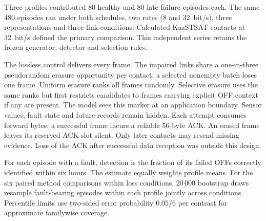 Three profiles contributed 80 healthy and 80 late-failure episodes each. The same 480 episodes ran under both schedules, two rates (8 and 32~bit/s), three representations and three link conditions. Calculated KazSTSAT contacts at 32~bit/s defined the primary comparison. This independent series retains the frozen generator, detector and selection rules.

The lossless control delivers every frame. The impaired links share a one-in-three pseudorandom erasure opportunity per contact; a selected nonempty batch loses one frame. Uniform erasure ranks all frames randomly. Selective erasure uses the same ranks but first restricts candidates to frames carrying explicit OFF context if any are present. The model sees this marker at an application boundary. Sensor values, fault state and future records remain hidden. Each attempt consumes forward bytes; a successful frame incurs a reliable 56-byte ACK. An erased frame leaves its reserved ACK slot silent. Only later contacts may resend missing evidence. Loss of the ACK after successful data reception was outside this design.

For each episode with a fault, detection is the fraction of its failed OFFs correctly identified within six hours. The estimate equally weights profile means. For the six paired method comparisons within loss conditions, 20\,000 bootstrap draws resample fault-bearing episodes within each profile jointly across conditions. Percentile limits use two-sided error probability $0.05/6$ per contrast for approximate familywise coverage.

